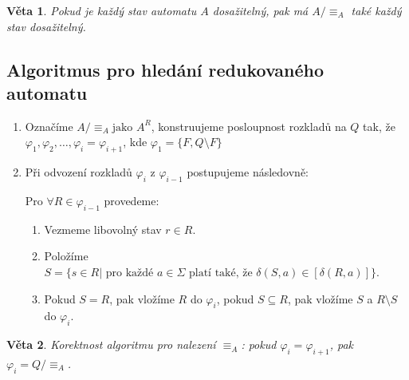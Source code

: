 \documentclass[10pt, a4paper, titlepage]{article}
\theoremstyle{note}
\newtheorem{veta}{Věta}
\begin{document}
\begin{veta}
Pokud je každ\'y stav automatu $A$ dosažiteln\'y, pak m\'a $A/ \equiv_{A}$ tak\'e každ\'y stav dosažiteln\'y.
\end{veta}

\subsection{Algoritmus pro hled\'an\'i redukovan\'eho automatu}

\begin{enumerate}
\item
Označ\'ime $A/ \equiv_{A} \text{jako } A^{R}$, konstruujeme posloupnost rozkladů na $Q$ tak, že $\varphi_{1}, \varphi_{2}, \ldots, \varphi_{i} = \varphi_{i+1}$,
kde $\varphi_{1} = \lbrace F, Q \setminus F \rbrace$

\item
Při odvozen\'i rozkladů $\varphi_{i}$ z $\varphi_{i-1}$ postupujeme n\'asledovně:

Pro $\forall R \in \varphi_{i-1}$ provedeme:
\begin{enumerate}
\item
Vezmeme libovoln\'y stav $r \in R$.

\item
Polož\'ime $S = \lbrace s \in R | \text{ pro každ\'e } a \in \Sigma \text{ plat\'i tak\'e, že }\delta(S, a) \in [\delta(R, a)] \rbrace$.

\item
Pokud $S = R$, pak vlož\'ime $R$ do $\varphi_{i}$, pokud $S \subseteq R$, pak vlož\'ime $S$ a $R \setminus S$ do $\varphi_{i}$.
\end{enumerate}
\end{enumerate}

\begin{veta}
Korektnost algoritmu pro nalezen\'i $\equiv_{A}$: pokud $\varphi_{i} = \varphi_{i+1}$, pak $\varphi_{i} = Q/ \equiv_{A}$.
\end{veta}
\end{document}
